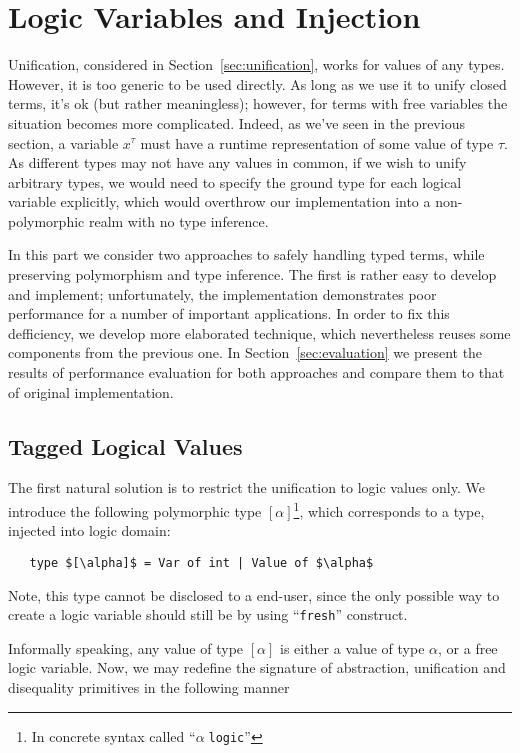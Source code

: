 \section{Logic Variables and Injection}
\label{sec:injection}

Unification, considered in Section~\ref{sec:unification}, works for values of any types. However, it
is too generic to be used directly. As long as we use it to unify closed terms, it's ok (but rather meaningless); 
however, for terms with free variables the situation becomes more complicated. Indeed, as we've seen in the
previous section, a variable $x^\tau$ must have a runtime representation of some value of type $\tau$. As different
types may not have any values in common, if we wish to unify arbitrary types, we would need to specify the 
ground type for each logical variable explicitly, which would overthrow our implementation into a non-polymorphic 
realm with no type inference.

In this part we consider two approaches to safely handling typed terms, while preserving polymorphism and
type inference. The first is rather easy to develop and implement; unfortunately, the implementation demonstrates 
poor performance for a number of important applications. In order to fix this defficiency, we develop more 
elaborated technique, which nevertheless reuses some components from the previous one. In Section~\ref{sec:evaluation}
we present the results of performance evaluation for both approaches and compare them to that of original 
implementation.

\subsection{Tagged Logical Values}

The first natural solution is to restrict the unification to logic values only. We introduce the following polymorphic
type $[\alpha]$\footnote{In concrete syntax called ``$\alpha\;$\lstinline{logic}''}, which corresponds to a type, injected into
logic domain:

\begin{lstlisting}
   type $[\alpha]$ = Var of int | Value of $\alpha$
\end{lstlisting}

Note, this type cannot be disclosed to a end-user, since the only possible way to create a logic variable should 
still be by using ``\lstinline{fresh}'' construct.

Informally speaking, any value of type $[\alpha]$ is either a value of type $\alpha$, or a free
logic variable. Now, we may redefine the signature of abstraction, unification and disequality primitives in the
following manner

